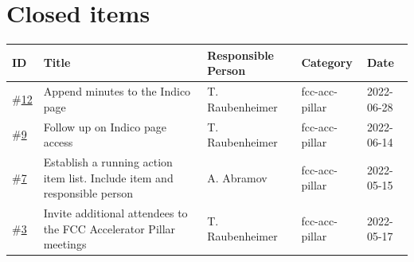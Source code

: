 \documentclass[12pt]{article}
\begin{document}
    \section*{Closed items}
    \begin{longtable}{|m{0.8cm} | m{6cm} | m{3.5cm} | m{2.5cm} | m{2cm}|}
    \hline
    ID & Title & Responsible Person & Category & Date \\
    \hline
    \#\href{https://github.com/fcccollab/fcc-action-items/issues/12}{12} & Append minutes to the Indico page & T. Raubenheimer & fcc-acc-pillar & 2022-06-28 \\ 
    \hline
    \#\href{https://github.com/fcccollab/fcc-action-items/issues/9}{9} & Follow up on Indico page access & T. Raubenheimer & fcc-acc-pillar & 2022-06-14 \\ 
    \hline
    \#\href{https://github.com/fcccollab/fcc-action-items/issues/7}{7} & Establish a running action item list. Include item and responsible person & A. Abramov & fcc-acc-pillar & 2022-05-15 \\ 
    \hline
    \#\href{https://github.com/fcccollab/fcc-action-items/issues/3}{3} & Invite additional attendees to the FCC Accelerator Pillar meetings & T. Raubenheimer & fcc-acc-pillar & 2022-05-17 \\ 
    \hline
    \end{longtable}
    
\end{document}
